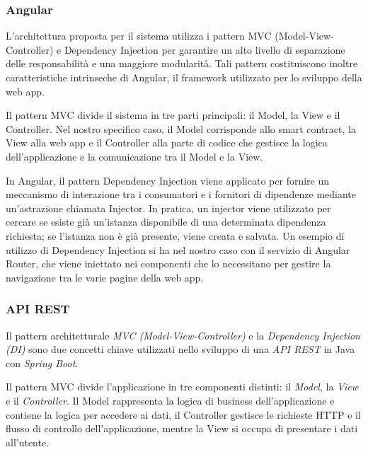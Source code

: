 

\subsubsection{Angular}

L'architettura proposta per il sistema utilizza i pattern MVC (Model-View-Controller) e Dependency Injection per garantire un alto livello di separazione delle responsabilità e una maggiore modularità. Tali pattern costituiscono inoltre caratteristiche intrinseche di Angular, il framework utilizzato per lo sviluppo della web app.

Il pattern MVC divide il sistema in tre parti principali: il Model, la View e il Controller. Nel nostro specifico caso, il Model corrisponde allo smart contract, la View alla web app e il Controller alla parte di codice che gestisce la logica dell'applicazione e la comunicazione tra il Model e la View.

In Angular, il pattern Dependency Injection viene applicato per fornire un meccanismo di interazione tra i consumatori e i fornitori di dipendenze mediante un'astrazione chiamata Injector. In pratica, un injector viene utilizzato per cercare se esiste già un'istanza disponibile di una determinata dipendenza richiesta; se l'istanza non è già presente, viene creata e salvata. Un esempio di utilizzo di Dependency Injection si ha nel nostro caso con il servizio di Angular Router, che viene iniettato nei componenti che lo necessitano per gestire la navigazione tra le varie pagine della web app.

\subsubsection{API REST}
Il pattern architetturale \textit{MVC (Model-View-Controller)} e la \textit{Dependency Injection (DI)} sono due concetti chiave utilizzati nello sviluppo di una \textit{API REST} in Java con \textit{Spring Boot}.

Il pattern MVC divide l'applicazione in tre componenti distinti: il \textit{Model}, la \textit{View} e il \textit{Controller}. Il Model rappresenta la logica di business dell'applicazione e contiene la logica per accedere ai dati, il Controller gestisce le richieste HTTP e il flusso di controllo dell'applicazione, mentre la View si occupa di presentare i dati all'utente.


